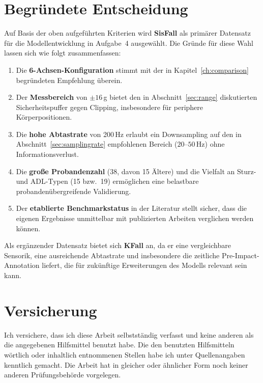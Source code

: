 \documentclass[11pt,a4paper,oneside]{report}
\begin{document}
\section{Begründete Entscheidung}
\label{sec:dataset_decision}

Auf Basis der oben aufgeführten Kriterien wird \textbf{SisFall} als
primärer Datensatz für die Modellentwicklung in Aufgabe~4 ausgewählt.
Die Gründe für diese Wahl lassen sich wie folgt zusammenfassen:

\begin{enumerate}
\item Die \textbf{6-Achsen-Konfiguration} stimmt mit der in
      Kapitel~\ref{ch:comparison} begründeten Empfehlung überein.
\item Der \textbf{Messbereich} von $\pm 16$\,g bietet den in
      Abschnitt~\ref{sec:range} diskutierten Sicherheitspuffer gegen
      Clipping, insbesondere für periphere Körperpositionen.
\item Die \textbf{hohe Abtastrate} von 200\,Hz erlaubt ein Downsampling auf
      den in Abschnitt~\ref{sec:samplingrate} empfohlenen Bereich
      ($20$--$50$\,Hz) ohne Informationsverlust.
\item Die \textbf{große Probandenzahl} (38, davon 15 Ältere) und die
      Vielfalt an Sturz- und ADL-Typen (15 bzw.\ 19) ermöglichen eine
      belastbare probandenübergreifende Validierung.
\item Der \textbf{etablierte Benchmarkstatus} in der Literatur stellt sicher,
      dass die eigenen Ergebnisse unmittelbar mit publizierten Arbeiten
      verglichen werden können.
\end{enumerate}

Als ergänzender Datensatz bietet sich \textbf{KFall} an, da er eine
vergleichbare Sensorik, eine ausreichende Abtastrate und insbesondere die
zeitliche Pre-Impact-Annotation liefert, die für zukünftige Erweiterungen
des Modells relevant sein kann.

\newpage


\newpage
\thispagestyle{empty}
\vspace*{2cm}
\section*{Versicherung}
Ich versichere, dass ich diese Arbeit selbstständig verfasst und keine anderen
als die angegebenen Hilfsmittel benutzt habe. Die den benutzten Hilfsmitteln
wörtlich oder inhaltlich entnommenen Stellen habe ich unter Quellenangaben
kenntlich gemacht. Die Arbeit hat in gleicher oder ähnlicher Form noch keiner
anderen Prüfungsbehörde vorgelegen.
\end{document}
